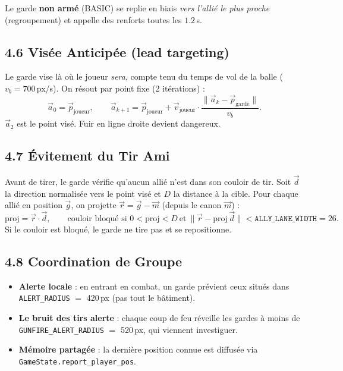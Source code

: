 \documentclass[11pt,a4paper]{article}
\newcommand{\code}[1]{\colorbox{codebg}{\texttt{#1}}}
\newcommand{\param}[2]{\code{#1} $=$ #2}
\begin{document}
Le garde \textbf{non arm\'e} (BASIC) se replie en biais \emph{vers l'alli\'e le plus
proche} (regroupement) et appelle des renforts toutes les $1.2$\,s.

\subsection{4.6 Vis\'ee Anticip\'ee (lead targeting)}
Le garde vise l\`a o\`u le joueur \emph{sera}, compte tenu du temps de vol de la
balle ($v_b = 700$\,px/s). On r\'esout par point fixe (2 it\'erations) :
\[
\vec{a}_0 = \vec{p}_{\text{joueur}},\qquad
\vec{a}_{k+1} = \vec{p}_{\text{joueur}} + \vec{v}_{\text{joueur}}\cdot
\frac{\lVert \vec{a}_k - \vec{p}_{\text{garde}} \rVert}{v_b}.
\]
$\vec{a}_2$ est le point vis\'e. Fuir en ligne droite devient dangereux.

\subsection{4.7 \'Evitement du Tir Ami}
Avant de tirer, le garde v\'erifie qu'aucun alli\'e n'est dans son couloir de tir.
Soit $\vec{d}$ la direction normalis\'ee vers le point vis\'e et $D$ la distance \`a
la cible. Pour chaque alli\'e en position $\vec{g}$, on projette
$\vec{r}=\vec{g}-\vec{m}$ (depuis le canon $\vec{m}$) :
\[
\text{proj} = \vec{r}\cdot\vec{d},\qquad
\text{couloir bloqu\'e si } 0 < \text{proj} < D \ \text{et}\
\big\lVert \vec{r} - \text{proj}\,\vec{d}\big\rVert < \texttt{ALLY\_LANE\_WIDTH}=26.
\]
Si le couloir est bloqu\'e, le garde ne tire pas et se repositionne.

\subsection{4.8 Coordination de Groupe}
\begin{itemize}[leftmargin=*]
  \item \textbf{Alerte locale} : en entrant en combat, un garde pr\'evient ceux situ\'es
        dans \param{ALERT\_RADIUS}{420}\,px (pas tout le b\^atiment).
  \item \textbf{Le bruit des tirs alerte} : chaque coup de feu r\'eveille les gardes
        \`a moins de \param{GUNFIRE\_ALERT\_RADIUS}{520}\,px, qui viennent investiguer.
  \item \textbf{M\'emoire partag\'ee} : la derni\`ere position connue est diffus\'ee via
        \code{GameState.report\_player\_pos}.
\end{itemize}
\end{document}
